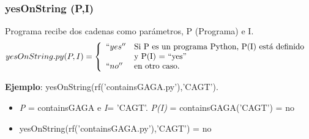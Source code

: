 \documentclass[xcolor=table]{beamer}
\begin{document}
\begin{frame}  \frametitle{yesOnString (P,I)}  \small  

Programa recibe dos cadenas como parámetros,  P (Programa) e I. 
    \begin{equation}
      \label{eq:yesOnString.py}
      yesOnString.py (P,I) =  \left\{
	        \begin{array}{ll}
		  ``yes''      & \text{Si P es un programa Python, P(I) está definido } \\
                        &   \text{y P(I) = ``yes''} \\
		``no''     & \text{en otro caso.} \\
	       \end{array}
	    \right.
    \end{equation}

    \textbf{Ejemplo}: yesOnString(rf('containsGAGA.py'),'CAGT').
    \begin{itemize}
        \item \textit{P} = containsGAGA e \textit{I}= 'CAGT'. \textit{P(I)} = containsGAGA('CAGT') = no
        \item yesOnString(rf('containsGAGA.py'),'CAGT') = no
    \end{itemize}
   

    

\end{frame} 
\end{document}

